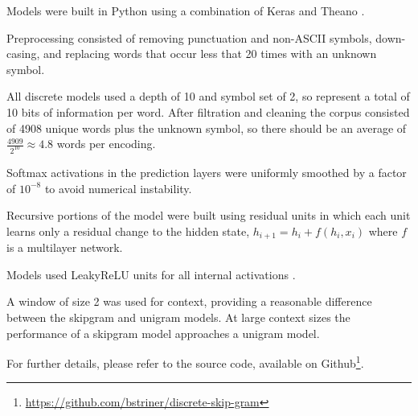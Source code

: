\documentclass[sigconf]{acmart}
\begin{document}
Models were built in Python using a combination of Keras \cite{chollet2015keras} and Theano \cite{2016arXiv160502688short}.

Preprocessing consisted of removing punctuation and non-ASCII symbols, down-casing, and replacing words that occur less that 20 times with an unknown symbol.

All discrete models used a depth of 10 and symbol set of 2, so represent a total of 10 bits of information per word. After filtration and cleaning the corpus consisted of 4908 unique words plus the unknown symbol, so there should be an average of $\frac{4909}{2^{10}} \approx 4.8$ words per encoding.

Softmax activations in the prediction layers were uniformly smoothed by a factor of $10^{-8}$ to avoid numerical instability.

Recursive portions of the model were built using residual units \cite{DBLP:journals/corr/HeZRS15} in which each unit learns only a residual change to the hidden state,
$h_{i+1} = h_i + f(h_i, x_i)$ where $f$ is a multilayer network.

Models used LeakyReLU units for all internal activations \cite{Maas2013} \cite{DBLP:journals/corr/XuWCL15}.

A window of size 2 was used for context, providing a reasonable difference between the skipgram and unigram models. At large context sizes the performance of a skipgram model approaches a unigram model.

For further details, please refer to the source code, available on Github\footnote{\url{https://github.com/bstriner/discrete-skip-gram}}.

\nocite{*}


 
\end{document}
